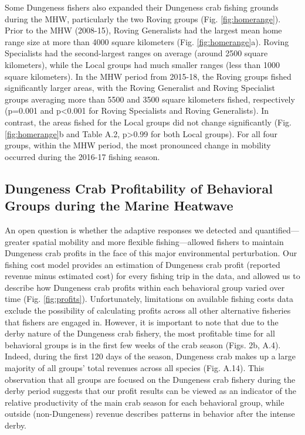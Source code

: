 \documentclass[]{elsarticle} %
\begin{document}
Some Dungeness fishers also expanded their Dungeness crab fishing
grounds during the MHW, particularly the two Roving groups (Fig.
\ref{fig:homerange}). Prior to the MHW (2008-15), Roving Generalists had
the largest mean home range size at more than 4000 square kilometers
(Fig. \ref{fig:homerange}a). Roving Specialists had the second-largest
ranges on average (around 2500 square kilometers), while the Local
groups had much smaller ranges (less than 1000 square kilometers). In
the MHW period from 2015-18, the Roving groups fished significantly
larger areas, with the Roving Generalist and Roving Specialist groups
averaging more than 5500 and 3500 square kilometers fished, respectively
(p=0.001 and p\textless0.001 for Roving Specialists and Roving
Generalists). In contrast, the areas fished for the Local groups did not
change significantly (Fig. \ref{fig:homerange}b and Table A.2,
p\textgreater0.99 for both Local groups). For all four groups, within
the MHW period, the most pronounced change in mobility occurred during
the 2016-17 fishing season.

\hypertarget{dungeness-crab-profitability-of-behavioral-groups-during-the-marine-heatwave}{%
\subsection{Dungeness Crab Profitability of Behavioral Groups during the
Marine
Heatwave}\label{dungeness-crab-profitability-of-behavioral-groups-during-the-marine-heatwave}}

An open question is whether the adaptive responses we detected and
quantified---greater spatial mobility and more flexible
fishing---allowed fishers to maintain Dungeness crab profits in the face
of this major environmental perturbation. Our fishing cost model
provides an estimation of Dungeness crab profit (reported revenue minus
estimated cost) for every fishing trip in the data, and allowed us to
describe how Dungeness crab profits within each behavioral group varied
over time (Fig. \ref{fig:profits}). Unfortunately, limitations on
available fishing costs data exclude the possibility of calculating
profits across all other alternative fisheries that fishers are engaged
in. However, it is important to note that due to the derby nature of the
Dungeness crab fishery, the most profitable time for all behavioral
groups is in the first few weeks of the crab season (Figs. 2b, A.4).
Indeed, during the first 120 days of the season, Dungeness crab makes up
a large majority of all groups' total revenues across all species (Fig.
A.14). This observation that all groups are focused on the Dungeness
crab fishery during the derby period suggests that our profit results
can be viewed as an indicator of the relative productivity of the main
crab season for each behavioral group, while outside (non-Dungeness)
revenue describes patterns in behavior after the intense derby.
\end{document}
